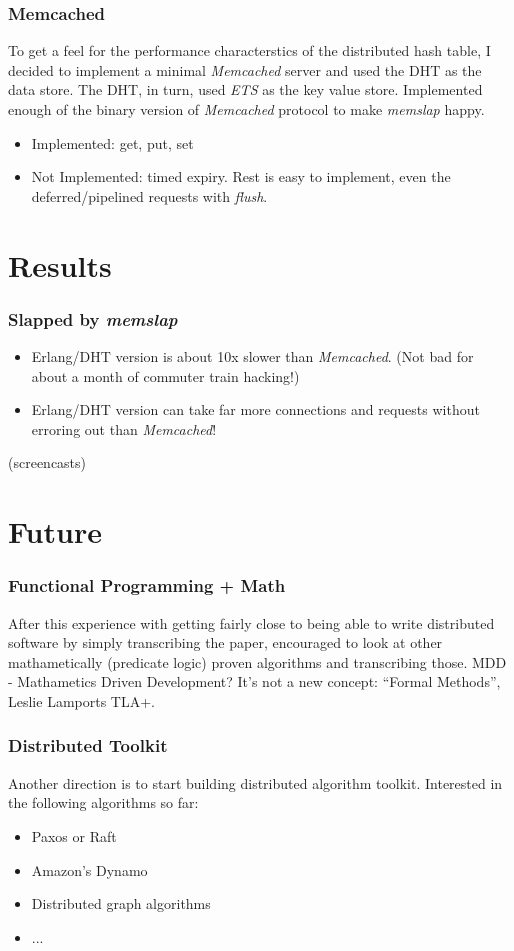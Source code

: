 \documentclass{beamer}
\begin{document}
\begin{frame}
  \frametitle{Memcached}

  To get a feel for the performance characterstics of the distributed
  hash table, I decided to implement a minimal \emph{Memcached} server
  and used the DHT as the data store. The DHT, in turn, used
  \emph{ETS} as the key value store. Implemented enough of the binary
  version of \emph{Memcached} protocol to make \emph{memslap} happy.

  \begin{itemize}
    \item Implemented: get, put, set
    \item Not Implemented: timed expiry. Rest is easy to implement,
      even the deferred/pipelined requests with \emph{flush}.
  \end{itemize}
\end{frame}


\section{Results}
\begin{frame}
  \frametitle{Slapped by \emph{memslap}}
  \begin{itemize}
  \item Erlang/DHT version is about 10x slower than
    \emph{Memcached}. (Not bad for about a month of commuter train
    hacking!)
  \item Erlang/DHT version can take far more connections and requests
    without erroring out than \emph{Memcached}!
  \end{itemize}
  (screencasts)
\end{frame}


\section{Future}
\begin{frame}
  \frametitle{Functional Programming + Math}

  After this experience with getting fairly close to being able to
  write distributed software by simply transcribing the paper,
  encouraged to look at other mathametically (predicate logic) proven
  algorithms and transcribing those. MDD - Mathametics Driven
  Development? It's not a new concept: ``Formal Methods'', Leslie
  Lamports TLA+.

\end{frame}
\begin{frame}
  \frametitle{Distributed Toolkit}

  Another direction is to start building distributed algorithm
  toolkit. Interested in the following algorithms so far:

  \begin{itemize}
  \item Paxos or Raft
  \item Amazon's Dynamo
  \item Distributed graph algorithms
  \item ...
  \end{itemize}
\end{frame}
\end{document}
